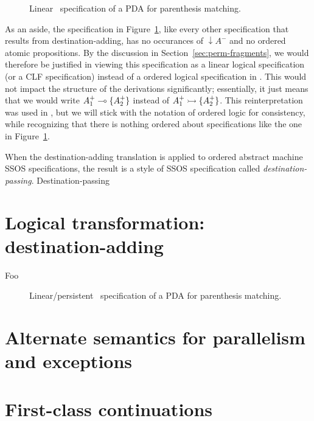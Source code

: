 \begin{figure}
\caption{Linear \sls~specification of a PDA for parenthesis matching.}
\label{fig:pda-lin}
\end{figure}

As an aside, the specification in Figure~\ref{fig:pda-lin}, like every
other specification that results from destination-adding, has no
occurances of ${\downarrow}A^-$ and no ordered atomic propositions. By
the discussion in Section~\ref{sec:perm-fragments}, we would therefore
be justified in viewing this specification as a linear logical
specification (or a CLF specification) instead of a ordered logical
specification in \sls.  This would not impact the structure of the
derivations significantly; essentially, it just means that we would
write $A^+_1 \multimap \{ A^+_2 \}$ instead of $A^+_1 \rightarrowtail \{ A^+_2
\}$.  This reinterpretation was used in \cite{simmons11logical}, but
we will stick with the notation of ordered logic for consistency,
while recognizing that there is nothing ordered
about specifications like the one in Figure~\ref{fig:pda-lin}. 

When the destination-adding translation is applied to ordered abstract
machine SSOS specifications, the result is a style of SSOS
specification called {\it destination-passing}. Destination-passing

\section{Logical transformation: destination-adding}
\label{sec:destination-adding}

Foo

\begin{figure}
\caption{Linear/persistent \sls~specification of a PDA for parenthesis
  matching.}
\label{fig:pda-pers}
\end{figure}


\section{Alternate semantics for parallelism and exceptions}
\label{sec:modular-parallelism}

\section{First-class continuations}

